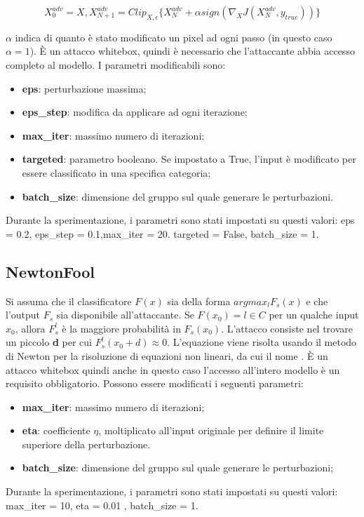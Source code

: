 \[X^{adv}_{0} = X, X^{adv}_{N+1} = Clip_{X,\epsilon}\{ X^{adv}_{N} + \alpha sign(\nabla _{X}J(X^{adv}_{N},y_{true})) \}\]

$\alpha$ indica di quanto è stato modificato un pixel ad ogni passo (in questo caso $\alpha=1$). È un attacco whitebox, quindi è necessario che l'attaccante abbia accesso completo al modello. I parametri modificabili sono:\begin{itemize}
    \item \textbf{eps}: perturbazione massima;
    \item \textbf{eps\_step}: modifica da applicare ad ogni iterazione;
    \item \textbf{max\_iter}: massimo numero di iterazioni;
    \item \textbf{targeted}: parametro booleano. Se impostato a True, l'input è modificato  per essere classificato in una specifica categoria;
    \item \textbf{batch\_size}: dimensione del gruppo sul quale generare le perturbazioni.
\end{itemize}
Durante la sperimentazione, i parametri sono stati impostati su questi valori: eps = 0.2, eps\_step = 0.1,max\_iter = 20. targeted = False, batch\_size = 1.

\subsection{NewtonFool}

Si assuma che  il classificatore $F(x)$ sia della forma $arg max_l F_s(x)$ e che l'output $F_s$ sia disponibile all'attaccante. Se $F(x_0) = l \in C$ per un qualche  input $x_0$, allora $F^l_s$ è la maggiore probabilità
in $F_s(x_0)$. L'attacco consiste nel trovare un piccolo \textbf{d} per cui $F^l_s(x_0 + d) \approx 0$. L'equazione viene risolta usando il metodo di Newton
per la risoluzione di equazioni non lineari, da cui il nome \cite{newton}. È un  attacco whitebox quindi anche in questo caso l'accesso all'intero modello è un requisito obbligatorio. Possono essere modificati i seguenti parametri: \begin{itemize}
    \item \textbf{max\_iter}: massimo numero di iterazioni;
    \item \textbf{eta}: coefficiente $\eta$, moltiplicato all'input originale per definire il limite superiore della perturbazione.
    \item \textbf{batch\_size}: dimensione del gruppo sul quale generare le perturbazioni;
   \end{itemize}
Durante la sperimentazione, i parametri sono stati impostati su questi valori: max\_iter = 10, eta = 0.01 , batch\_size = 1.

